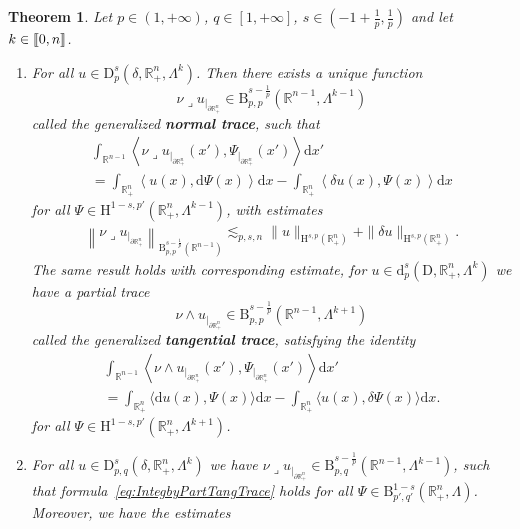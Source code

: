 \documentclass[10pt]{amsart}
\newtheorem{theo}{Theorem}[section]
\theoremstyle{definition}\newtheorem{defi}[theo]{Definition}\newtheorem{rema}[theo]{Remark}\newtheorem{exam}[theo]{Example}\newtheorem{exem}[theo]{Example}\newtheorem{nota}[theo]{Notation}
\newcommand{\bbR}{\mathbb{R}}
\newcommand{\rmH}{\mathrm{H}}%
\newcommand{\rmB}{\mathrm{B}}
\newcommand{\rmd}{\mathrm{d}}
\newcommand{\rmD}{\mathrm{D}}
\newcommand{\llbracket}{\mathopen{[\mkern -2.7mu[}}
\newcommand{\rrbracket}{\mathclose{]\mkern -2.7mu]}}
\newcommand{\llb}{\llbracket}
\newcommand{\rrb}{\rrbracket}
\newcommand{\iprod}{\mathbin{\lrcorner}}
\newcommand*{\romanenumi}{\renewcommand*{\theenumi}{\roman{enumi}}}
\begin{document}
\begin{theo}\label{thm:TracesDifferentialformsInhomSpaces}
Let $p\in(1,+\infty)$, $q\in[1,+\infty]$, $s\in(-1+\frac{1}{p},\frac{1}{p})$ and let $k\in\llb 0,n\rrb$.
\begin{enumerate}\romanenumi
\item\label{theoA.1.1} For all $u\in{\rmD}^{s}_{p}(\delta,\bbR^{n}_+,\Lambda^k)$. Then there exists a unique function
\[
\nu\iprod u_{|_{\partial\bbR^n_+}}\in \rmB^{s-\frac{1}{p}}_{p,p}\left(\bbR^{n-1},\Lambda^{k-1}\right)
\]
called the generalized \textbf{normal trace}, such that
\begin{multline}\label{eq:IntegbyPartTangTrace}
\int_{\bbR^{n-1}}\left\langle \nu\iprod u_{|_{\partial\bbR^n_+}}(x'), {\Psi}_{|_{\partial\bbR^n_+}}(x') \right\rangle\rmd x' \\
= \int_{\bbR^{n}_+} \left\langle u(x), \rmd {\Psi}(x)\right\rangle\rmd x- \int_{\bbR^{n}_+}\left\langle \delta u(x), {\Psi}(x)\right\rangle\rmd x 
\end{multline}
for all $\Psi\in \rmH^{1-s,p'}(\bbR^n_+, \Lambda^{k-1})$, with estimates
\begin{align*}
\left\|\nu\iprod u_{|_{\partial\bbR^n_+}} \right\|_{\rmB^{s-\frac{1}{p}}_{p,p}\left(\bbR^{n-1}\right)}\lesssim_{p,s,n} \| u \|_{{\rmH}^{s,p}\left(\bbR^n_+\right)} + \| \delta u \|_{{\rmH}^{s,p}\left(\bbR^n_+\right)} .
\end{align*}
The same result holds with corresponding estimate, for $u\in {\rmd}^{s}_{p}(\rmD,\bbR^{n}_+,\Lambda^k)$ we have a partial trace
\[
\nu\wedge u_{|_{\partial\bbR^n_+}}\in \rmB^{s-\frac{1}{p}}_{p,p}\left(\bbR^{n-1},\Lambda^{k+1}\right)
\]
called the generalized \textbf{tangential trace}, satisfying the identity
\begin{multline}\label{eq:IntegbyPartNormTrace}
\int_{\bbR^{n-1}}\left\langle \nu\wedge u_{|_{\partial\bbR^n_+}}(x'), {\Psi}_{|_{\partial\bbR^n_+}} (x') \right\rangle \rmd x' \\
= \int_{\bbR^{n}_+} \langle \rmd u(x), {\Psi}(x)\rangle\rmd x - \int_{\bbR^{n}_+} \langle u(x), \delta {\Psi}(x)\rangle\rmd x . 
\end{multline}
for all $\Psi\in \rmH^{1-s,p'}(\bbR^n_+, \Lambda^{k+1})$.
\item\label{theoA.1.2} For all $u\in{\rmD}^{s}_{p,q}(\delta,\bbR^{n}_+,\Lambda^k)$ we have $\nu\iprod u_{|_{\partial\bbR^n_+}}\in \rmB^{s-\frac{1}{p}}_{p,q}(\bbR^{n-1},\Lambda^{k-1})$, such that formula~\eqref{eq:IntegbyPartTangTrace} holds for all $\Psi\in \rmB^{1-s}_{p',q'}(\bbR^n_+, \Lambda)$. Moreover, we have the estimates

\end{enumerate}
\end{theo}
\end{document}
